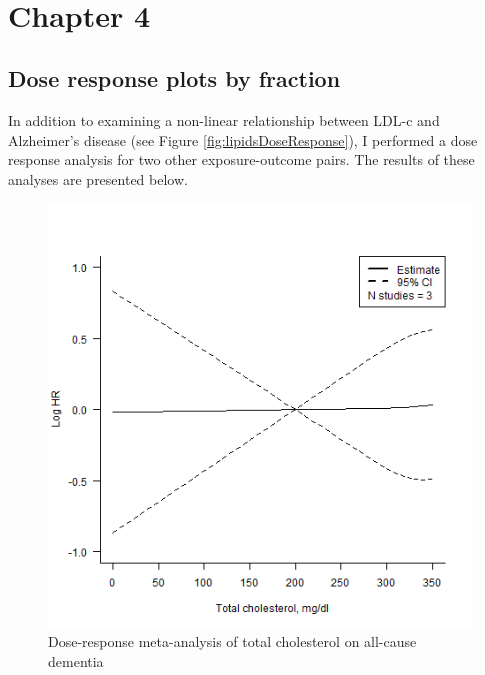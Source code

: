 \documentclass[a4paper, twoside]{templates/ociamthesis}
\begin{document}
~

\hypertarget{chapter-4}{%
\section{Chapter 4}\label{chapter-4}}

\hypertarget{appendix-dr-fraction}{%
\subsection{Dose response plots by fraction}\label{appendix-dr-fraction}}

In addition to examining a non-linear relationship between LDL-c and Alzheimer's disease (see Figure \ref{fig:lipidsDoseResponse}), I performed a dose response analysis for two other exposure-outcome pairs. The results of these analyses are presented below.





\begin{figure}[H]

{\centering \includegraphics[width=0.6\linewidth]{figures/sys-rev/dr_Dementia_TC} 

}

\caption[shortcap]{Dose-response meta-analysis of total cholesterol on all-cause dementia}\label{fig:drDemeniaTC}
\end{figure}
\end{document}
